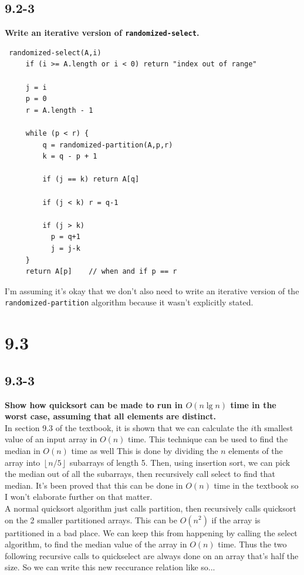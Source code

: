 \documentclass[11pt]{article}
\def\lf{\left\lfloor}
\def\rf{\right\rfloor}
\begin{document}
 \subsection*{9.2-3}
 \textbf{Write an iterative version of \texttt{randomized-select}.} \\
 \begin{verbatim}
 randomized-select(A,i)
     if (i >= A.length or i < 0) return "index out of range"

     j = i
     p = 0
     r = A.length - 1

     while (p < r) {
         q = randomized-partition(A,p,r)
         k = q - p + 1 
         
         if (j == k) return A[q]

         if (j < k) r = q-1

         if (j > k)
           p = q+1 
           j = j-k
     }
     return A[p]    // when and if p == r
 \end{verbatim}
 I'm assuming it's okay that we don't also need to write an iterative version of the 
 \texttt{randomized-partition} algorithm because it wasn't explicitly stated.
 \newpage

 \section*{9.3}
 \subsection*{9.3-3}
 \textbf{Show how quicksort can be made to run in $O(n \lg n)$ time in the worst case, assuming 
 that all elements are distinct.} \\

 In section 9.3 of the textbook, it is shown that we can calculate the $i$th smallest value of an 
 input array in $O(n)$ time.  This technique can be used to find the median in $O(n)$ time as well 
 This is done by dividing the $n$ elements of the array into $\lf n/5 \rf$ subarrays of length 5.  
 Then, using insertion sort, we can pick the median out of all the subarrays, then recursively call 
 select to find that median.  It's been proved that this can be done in $O(n)$ time in the textbook 
 so I won't elaborate further on that matter. \\ 

 A normal quicksort algorithm just calls partition, then recursively calls quicksort on the 2 smaller 
 partitioned arrays.  This can be $O(n^2)$ if the array is partitioned in a bad place.  We can keep 
 this from happening by calling the select algorithm, to find the median value of the array in $O(n)$ 
 time.  Thus the two following recursive calls to quickselect are always done on an array that's half 
 the size.  So we can write this new reccurance relation like so...
\end{document}
